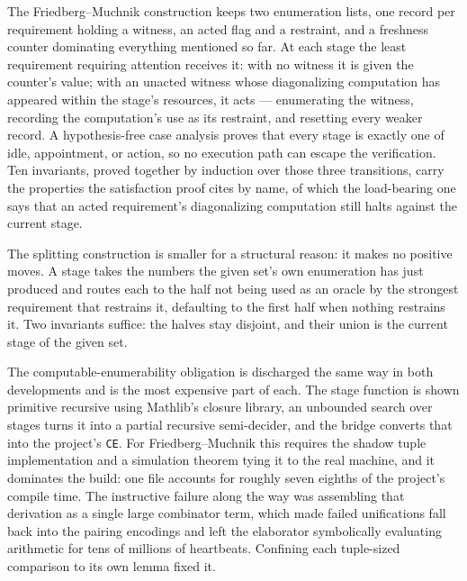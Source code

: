 The Friedberg--Muchnik construction keeps two enumeration lists, one record
per requirement holding a witness, an acted flag and a restraint, and a
freshness counter dominating everything mentioned so far.  At each stage
the least requirement requiring attention receives it: with no witness it
is given the counter's value; with an unacted witness whose diagonalizing
computation has appeared within the stage's resources, it acts ---
enumerating the witness, recording the computation's use as its restraint,
and resetting every weaker record.  A hypothesis-free case analysis proves
that every stage is exactly one of idle, appointment, or action, so no
execution path can escape the verification.  Ten invariants, proved
together by induction over those three transitions, carry the properties
the satisfaction proof cites by name, of which the load-bearing one says
that an acted requirement's diagonalizing computation still halts against
the current stage.

The splitting construction is smaller for a structural reason: it makes no
positive moves.  A stage takes the numbers the given set's own enumeration
has just produced and routes each to the half not being used as an oracle
by the strongest requirement that restrains it, defaulting to the first
half when nothing restrains it.  Two invariants suffice: the halves stay
disjoint, and their union is the current stage of the given set.

The computable-enumerability obligation is discharged the same way in both
developments and is the most expensive part of each.  The stage function is
shown primitive recursive using Mathlib's closure library, an unbounded
search over stages turns it into a partial recursive semi-decider, and the
bridge converts that into the project's \texttt{CE}.  For
Friedberg--Muchnik this requires the shadow tuple implementation and a
simulation theorem tying it to the real machine, and it dominates the build:
one file accounts for roughly seven eighths of the project's compile time.
The instructive failure along the way was assembling that derivation as a
single large combinator term, which made failed unifications fall back into
the pairing encodings and left the elaborator symbolically evaluating
arithmetic for tens of millions of heartbeats.  Confining each
tuple-sized comparison to its own lemma fixed it.
